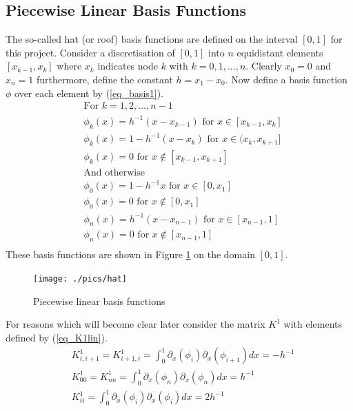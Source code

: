 \documentclass[11pt,fleqn]{article}
\theoremstyle{defstyle}
\begin{document}
\subsection{Piecewise Linear Basis Functions}
\label{section_plb}
The so-called hat (or roof) basis functions are defined on the interval $[0,1]$ for this project. Consider a discretisation of $[0,1]$ into $n$ equidistant elements $[x_{k-1}, x_k]$ where $x_k$ indicates node $k$ with $k=0,1,...,n$. Clearly $x_0=0$ and $x_n=1$ furthermore, define the constant $h = x_1-x_0$. Now define a basis function $\phi$ over each element by (\ref{eq_basis1}).  
\begin{equation}
\begin{aligned}
&\text{For } k=1,2,...,n-1 \\
&\phi_k(x) = h^{-1}(x-x_{k-1}) \text{ for } x \in [x_{k-1}, x_k] \\
&\phi_k(x) = 1-h^{-1}(x-x_{k}) \text{ for } x \in (x_{k}, x_{k+1}] \\
&\phi_k(x) = 0 \text{ for } x \notin [x_{k-1}, x_{k+1}] \\
&\text{And otherwise} \\
&\phi_0(x) = 1- h^{-1}x \text{ for } x \in [0, x_1] \\
&\phi_0(x) = 0 \text{ for } x \notin [0, x_1] \\
&\phi_n(x) = h^{-1}(x-x_{n-1}) \text{ for } x \in [x_{n-1}, 1] \\
&\phi_n(x) = 0 \text{ for } x \notin [x_{n-1}, 1] \\
\end{aligned}
\label{eq_basis1}
\end{equation}
These basis functions are shown in Figure \ref{fig_linbasis} on the domain $[0,1]$. 
\begin{figure}[H] 
\centering
\texttt{[image: ./pics/hat]}
\caption{Piecewise linear basis functions} 
\label{fig_linbasis}
\end{figure}
For reasons which will become clear later consider the matrix $K^1$ with elements defined by (\ref{eq_K1lin}).
\begin{equation}
\begin{aligned}
&K^1_{i,i+1}=K^1_{i+1,i}=\int^1_0 \partial_x(\phi_i)\partial_x(\phi_{i+1})dx = -h^{-1} \\
&K^1_{00} = K^1_{nn} = \int^1_0 \partial_x(\phi_n)\partial_x(\phi_{n})dx = h^{-1} \\
&K^1_{ii} = \int^1_0 \partial_x(\phi_i)\partial_x(\phi_{i})dx = 2h^{-1} \\
\end{aligned}
\label{eq_K1lin}
\end{equation}
\end{document}
